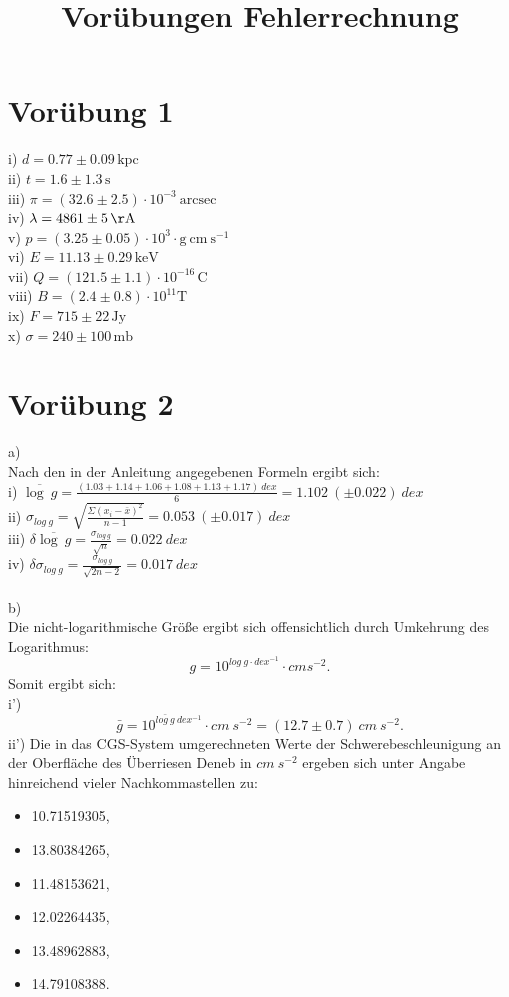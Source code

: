 \documentclass[titlepage]{scrartcl}
\begin{document}
\title{Vorübungen Fehlerrechnung}
\section{Vorübung 1}
i) $ d = 0.77 \pm 0.09\, \mathrm{kpc} $ \\
ii) $ t = 1.6 \pm 1.3 \, \mathrm{s} $ \\
iii) $ \pi = (32.6 \pm 2.5) \cdot 10^{-3} \ \mathrm{arcsec} $ \\
iv) $ \lambda = 4861 \pm 5 \, \mathrm{\AA} $ \\
v) $ p = (3.25 \pm 0.05)\cdot  10^{3} \cdot  \mathrm{g\ cm\ s^{-1}} $ \\
vi) $ E = 11.13 \pm 0.29 \,  \mathrm{keV} $ \\
vii) $ Q = (121.5 \pm 1.1) \cdot 10^{-16} \, \mathrm{C} $ \\
viii) $ B = (2.4 \pm 0.8)  \cdot 10^{11} \mathrm{T} $ \\
ix) $ F = 715 \pm 22\, \mathrm{Jy} $ \\
x) $ \sigma = 240 \pm 100\, \mathrm{mb} $ 

\section{Vorübung 2}
a) \\
Nach den in der Anleitung angegebenen Formeln ergibt sich: \\
i) $ \overline{\log\ g} = \frac{(1.03 + 1.14 + 1.06 + 1.08 + 1.13 + 1.17) \ dex }{6} = 1.102\ (\pm 0.022) \ dex $  \\
ii) $\sigma_{log\ g} = \sqrt{\frac{\Sigma(x_i - \bar{x})^2}{n-1}} = 0.053\ (\pm 0.017) \ dex $ \\
iii) $\delta \overline{\log\ g} = \frac{\sigma_{log\ g}}{\sqrt{n}}  = 0.022 \ dex $ \\
iv)  $ \delta \sigma_{log\ g} = \frac{\sigma_{log\ g}}{\sqrt{2n-2}} = 0.017 \ dex $ \\ \\
b) \\
Die nicht-logarithmische Größe ergibt sich offensichtlich durch Umkehrung des Logarithmus: 
\begin{equation}
g = 10^{log\ g\cdot dex^{-1}} \cdot cm s ^{-2}.
\nonumber
\end{equation} 
Somit ergibt sich: \\
i') 
\begin{equation}
 \bar{g} = 10^{\bar{log\ g} \ dex^{-1}} \cdot cm\ s^{-2} = (12.7 \pm 0.7)\ cm\ s^{-2}. 
 \nonumber
\end{equation}
ii') Die in das CGS-System umgerechneten Werte der Schwerebeschleunigung an der Oberfläche des Überriesen Deneb in $cm\ s^{-2} $ ergeben sich unter Angabe hinreichend vieler Nachkommastellen zu: \\
\begin{itemize}
\item 10.71519305,
\item 13.80384265,
\item 11.48153621,
\item 12.02264435,
\item 13.48962883,
\item 14.79108388.
\end{itemize}
\end{document}
